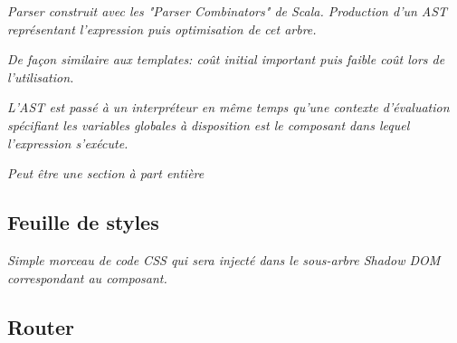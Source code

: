 \textit{Parser construit avec les "Parser Combinators" de Scala. Production d'un AST représentant l'expression puis optimisation de cet arbre.}

\textit{De façon similaire aux templates: coût initial important puis faible coût lors de l'utilisation.}

\textit{L'AST est passé à un interpréteur en même temps qu'une contexte d'évaluation spécifiant les variables globales à disposition est le composant dans lequel l'expression s'exécute.}

\textit{Peut être une section à part entière}

\subsection{Feuille de styles}
\textit{Simple morceau de code CSS qui sera injecté dans le sous-arbre Shadow DOM correspondant au composant.}

\subsection{Router}
